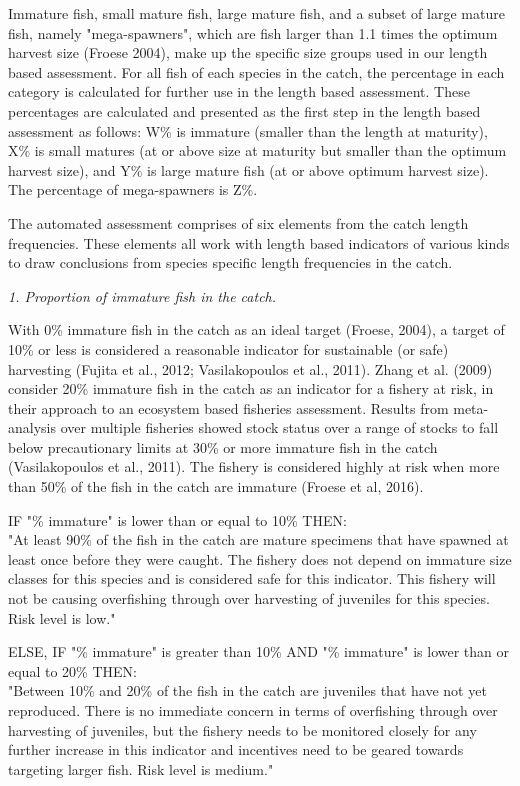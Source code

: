 Immature fish, small mature fish, large mature fish, and a subset of large mature fish, namely "mega-spawners", which are fish larger than 1.1 times the optimum harvest size (Froese 2004), make up the specific size groups used in our length based assessment. For all fish of each species in the catch, the percentage in each category is calculated for further use in the length based assessment. These percentages are calculated and presented as the first step in the length based assessment as follows: W\% is immature (smaller than the length at maturity), X\% is small matures (at or above size at maturity but smaller than the optimum harvest size), and Y\% is large mature fish (at or above optimum harvest size). The percentage of mega-spawners is Z\%.

The automated assessment comprises of six elements from the catch length frequencies. These elements all work with length based indicators of various kinds to draw conclusions from species specific length frequencies in the catch.

\textit{1. Proportion of immature fish in the catch.}

With 0\% immature fish in the catch as an ideal target (Froese, 2004), a target of 10\% or less is considered a reasonable indicator for sustainable (or safe) harvesting (Fujita et al., 2012; Vasilakopoulos et al., 2011). Zhang et al. (2009) consider 20\% immature fish in the catch as an indicator for a fishery at risk, in their approach to an ecosystem based fisheries assessment. Results from meta-analysis over multiple fisheries showed stock status over a range of stocks to fall below precautionary limits at 30\% or more immature fish in the catch (Vasilakopoulos et al., 2011). The fishery is considered highly at risk when more than 50\% of the fish in the catch are immature (Froese et al, 2016).

\clearpage
\newpage

IF "\% immature" is lower than or equal to 10\% THEN:\\[0cm]
"At least 90\% of the fish in the catch are mature specimens that have spawned at least once before they were caught. The fishery does not depend on immature size classes for this species and is considered safe for this indicator. This fishery will not be causing overfishing through over harvesting of juveniles for this species. Risk level is low."

ELSE, IF "\% immature" is greater than 10\% AND "\% immature" is lower than or equal to 20\% THEN:\\[0cm]
"Between 10\% and 20\% of the fish in the catch are juveniles that have not yet reproduced. There is no immediate concern in terms of overfishing through over harvesting of juveniles, but the fishery needs to be monitored closely for any further increase in this indicator and incentives need to be geared towards targeting larger fish. Risk level is medium."

